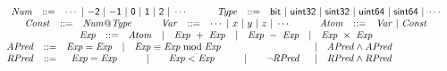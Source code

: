 
\begin{figure*}
  \centering
  \begin{math}
    \begin{array}{rclclcl}
      \multicolumn{7}{c}{
      \begin{array}{rclcrcl}
        \mathit{Num} & ::= & \cdots \ |\ \mathsf{-2} \ |\ \mathsf{-1}
                             \ |\ \mathsf{0} \ |\ \mathsf{1} \ |\
                             \mathsf{2} \ |\  \cdots
        & \hspace{1em} &
        \mathit{Type} & ::= & \mathsf{bit}\ |\
                              \mathsf{uint32}\ |\ \mathsf{sint32}\ |\
                              \mathsf{uint64}\ |\ \mathsf{sint64}\ |\ \cdots
      \end{array}
      }\\
      \multicolumn{7}{c}{
      \begin{array}{rclcrclcrcl}
      \mathit{Const} & ::= & \mathit{Num}\mathsf{@}\mathit{Type}
      & \hspace{1em} &
      \mathit{Var} & ::= & \cdots\ |\ x \ |\ y \ |\ z \ |\ \cdots
      & \hspace{1em} &
      \mathit{Atom} & ::= & \mathit{Var} \ |\ \mathit{Const}
      \end{array}
      }
      \\
      \multicolumn{7}{c}{
      \begin{array}{rclclclcl}
        \mathit{Exp} & ::= & \mathit{Atom}
        & | & \mathit{Exp}\ +\ \mathit{Exp}
        & | & \mathit{Exp}\ -\ \mathit{Exp}
        & | & \mathit{Exp}\ \times\ \mathit{Exp}
      \end{array}
      }
      \\
      \mathit{APred} & ::= &
        \mathit{Exp} = \mathit{Exp}
      & | & \mathit{Exp} \equiv \mathit{Exp} \bmod \mathit{Exp}
      & | & \mathit{APred} \wedge \mathit{APred}
      \\
      \mathit{RPred} & ::= &
      \multicolumn{3}{l}{
        \begin{array}{lclclcl}
          \mathit{Exp} = \mathit{Exp}
          & \hspace{2em}|\hspace{1em} & \mathit{Exp} < \mathit{Exp}
          & \hspace{2em}|\hspace{1em} & \neg \mathit{RPred}
        \end{array}
      }
      & | & \mathit{RPred} \wedge \mathit{RPred}
      \\

\end{array}
\end{math}
\end{figure*}
